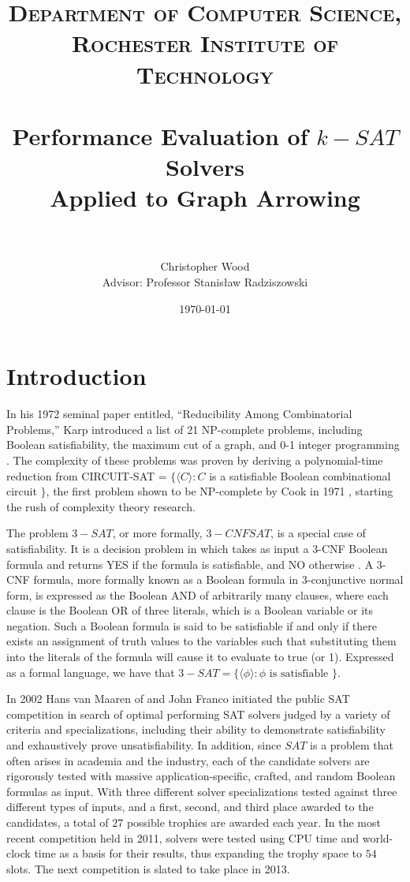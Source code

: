 \documentclass[paper=a4, fontsize=11pt]{scrartcl} %
\title{	
\normalfont \normalsize 
\textsc{Department of Computer Science, Rochester Institute of Technology} \\ [25pt] %
\horrule{2pt} \\[0.4cm] %
\huge Performance Evaluation of $k-SAT$ Solvers\\ 
\Large Applied to Graph Arrowing \\
\horrule{2pt} \\[0.5cm] %
}
\author{Christopher Wood \\ Advisor: Professor Stanis{\l}aw Radziszowski} %
\date{\normalsize \today} %
\begin{document}
\maketitle %

\section{Introduction}
In his 1972 seminal paper entitled, ``Reducibility Among Combinatorial Problems,'' Karp introduced a 
list of 21 NP-complete problems, including Boolean satisfiability, the maximum cut of a graph, 
and 0-1 integer programming \cite{karp72}. The complexity of these problems was proven by deriving
a polynomial-time reduction from CIRCUIT-SAT = $\{\langle C \rangle : C$ is a satisfiable Boolean combinational
circuit $\}$, the first problem shown to be NP-complete by Cook in 1971 \cite{cook71-np}, starting
the rush of complexity theory research. 

The problem $3-SAT$, or more formally, $3-CNF SAT$, is a special case of satisfiability.
It is a decision problem in which takes as input a 3-CNF Boolean formula and returns YES if 
the formula is satisfiable, and NO otherwise \cite{clrs90-algorithms}. A 3-CNF formula, more formally known as a Boolean 
formula in 3-conjunctive normal form, is expressed as the Boolean AND of arbitrarily many clauses,
where each clause is the Boolean OR of three literals, which is a Boolean variable or its negation. 
Such a Boolean formula is said to be satisfiable if and only if there exists an assignment of truth 
values to the variables such that substituting them into the literals of the formula will cause it 
to evaluate to true (or 1). Expressed as a formal language, we have that 
$3-SAT = \{\langle \phi \rangle : \phi \text{ is satisfiable }\}$.

In 2002 Hans van Maaren of and John Franco initiated the public SAT competition in
search of optimal performing SAT solvers judged by a variety of criteria and specializations, 
including their ability to demonstrate satisfiability and exhaustively prove unsatisfiability.
In addition, since $SAT$ is a problem that often arises in academia and the industry, 
each of the candidate solvers are rigorously tested with massive application-specific, 
crafted, and random Boolean formulas as input. With three different solver
specializations tested against three different types of inputs, and a first, second, 
and third place awarded to the candidates, a total of $27$ possible trophies are
awarded each year. In the most recent competition held in 2011, solvers were
tested using CPU time and world-clock time as a basis for their results, thus expanding
the trophy space to $54$ slots. The next competition is slated to take place in 2013. 
\end{document}
